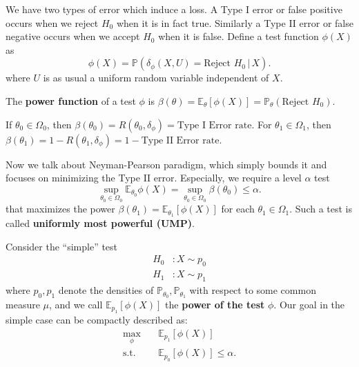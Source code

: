 We have two types of error which induce a loss. A Type I error or false positive occurs when we reject $H_0$ when it is in fact true. Similarly a Type II error or false negative occurs when we accept $H_0$ when it is false. Define a test function $\phi(X)$ as
\[
  \phi(X) = \mathbb{P}\!\left(\delta_\phi(X, U) = \text{Reject } H_0 \,\big|\, X\right).
\]
where $U$ is as usual a uniform random variable independent of $X$.

\begin{defn}
The \textbf{power function} of a test $\phi$ is 
$\beta(\theta) = \mathbb{E}_\theta[\phi(X)] = \mathbb{P}_\theta(\text{Reject } H_0)$.
\end{defn}

\begin{rem}
    If $\theta_0 \in \Omega_0$, then 
$\beta(\theta_0) = R(\theta_0, \delta_\phi) = \text{Type I Error rate}$. 
For $\theta_1 \in \Omega_1$, then 
$\beta(\theta_1) = 1 - R(\theta_1, \delta_\phi) = 1 - \text{Type II Error rate}$.
\end{rem}

Now we talk about Neyman-Pearson paradigm, which simply bounds it and focuses on minimizing the Type II error. Especially, we require a level $\alpha$ test
\[
  \sup_{\theta_0 \in \Omega_0} \mathbb{E}_{\theta_0} \phi(X) 
  = \sup_{\theta_0 \in \Omega_0} \beta(\theta_0) \le \alpha.
\]
that maximizes the 
power $\beta(\theta_1) = \mathbb{E}_{\theta_1}[\phi(X)]$ for each 
$\theta_1 \in \Omega_1$. Such a test is called \textbf{uniformly most powerful (UMP)}.

Consider the ``simple'' test
\[
  \begin{aligned}
    H_0 &: X \sim p_0 \\
    H_1 &: X \sim p_1
  \end{aligned}
\]
where $p_0, p_1$ denote the densities of $\mathbb{P}_{\theta_0}, \mathbb{P}_{\theta_1}$ 
with respect to some common measure $\mu$, and we call $\mathbb{E}_{p_1}[\phi(X)]$ 
the \textbf{power of the test} $\phi$. Our goal in the simple case can be compactly 
described as:
\[
  \begin{aligned}
    \max_{\phi} \quad & \mathbb{E}_{p_1}[\phi(X)] \\
    \text{s.t.} \quad & \mathbb{E}_{p_0}[\phi(X)] \le \alpha.
  \end{aligned}
\]

